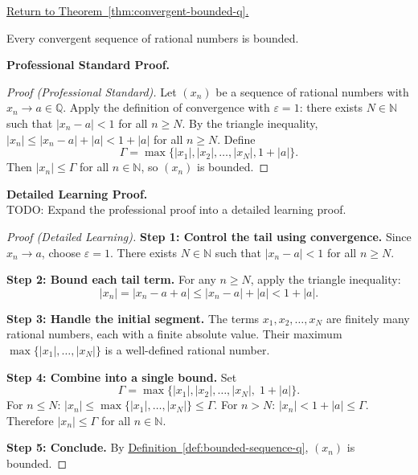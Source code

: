 
\newpage
{}
\label{prf:convergent-bounded-q}

\begin{remark*}[Return]
\hyperref[thm:convergent-bounded-q]{Return to Theorem~\ref*{thm:convergent-bounded-q}.}
\end{remark*}

\begin{theorem*}
Every convergent sequence of rational numbers is bounded.
\end{theorem*}

\textbf{Professional Standard Proof.}~\\
\begin{proof}
[Proof (Professional Standard)]
Let $(x_n)$ be a sequence of rational numbers with $x_n \to a \in \mathbb{Q}$.
Apply the definition of convergence with $\varepsilon = 1$: there exists
$N \in \mathbb{N}$ such that $|x_n - a| < 1$ for all $n \geq N$.
By the triangle inequality, $|x_n| \leq |x_n - a| + |a| < 1 + |a|$
for all $n \geq N$.
Define
\[
\Gamma = \max\{|x_1|, |x_2|, \ldots, |x_N|, 1 + |a|\}.
\]
Then $|x_n| \leq \Gamma$ for all $n \in \mathbb{N}$, so $(x_n)$ is bounded.
\end{proof}

\textbf{Detailed Learning Proof.}~\\
TODO: Expand the professional proof into a detailed learning proof.


\begin{proof}[Proof (Detailed Learning)]
\textbf{Step 1: Control the tail using convergence.}
Since $x_n \to a$, choose $\varepsilon = 1$.  There exists $N \in \mathbb{N}$
such that $|x_n - a| < 1$ for all $n \geq N$.

\textbf{Step 2: Bound each tail term.}
For any $n \geq N$, apply the triangle inequality:
\[
|x_n| = |x_n - a + a| \leq |x_n - a| + |a| < 1 + |a|.
\]

\textbf{Step 3: Handle the initial segment.}
The terms $x_1, x_2, \ldots, x_N$ are finitely many rational numbers,
each with a finite absolute value.  Their maximum $\max\{|x_1|,\ldots,|x_N|\}$
is a well-defined rational number.

\textbf{Step 4: Combine into a single bound.}
Set
\[
\Gamma = \max\bigl\{|x_1|, |x_2|, \ldots, |x_N|,\; 1 + |a|\bigr\}.
\]
For $n \leq N$: $|x_n| \leq \max\{|x_1|,\ldots,|x_N|\} \leq \Gamma$.
For $n > N$: $|x_n| < 1 + |a| \leq \Gamma$.
Therefore $|x_n| \leq \Gamma$ for all $n \in \mathbb{N}$.

\textbf{Step 5: Conclude.}
By \hyperref[def:bounded-sequence-q]{Definition~\ref*{def:bounded-sequence-q}},
$(x_n)$ is bounded.
\end{proof}

